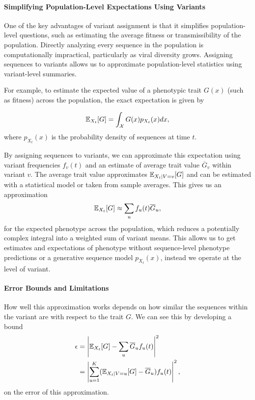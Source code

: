 \paragraph{Simplifying Population-Level Expectations Using Variants}

One of the key advantages of variant assignment is that it simplifies population-level questions, such as estimating the average fitness or transmissibility of the population. 
Directly analyzing every sequence in the population is computationally impractical, particularly as viral diversity grows. Assigning sequences to variants allows us to approximate population-level statistics using variant-level summaries.

For example, to estimate the expected value of a phenotypic trait $G(x)$ (such as fitness) across the population, the exact expectation is given by

\begin{equation}
  \mathbb{E}_{X_t}[G] = \int_{\mathcal{X}} G(x) p_{X_{t}}(x) dx,
\end{equation}
where $p_{X_t}(x)$ is the probability density of sequences at time $t$.

By assigning sequences to variants, we can approximate this expectation using variant frequencies $f_{v}(t)$ and an estimate of average trait value $\overline{G}_{v}$ within variant $v$.
The average trait value approximates $\mathbb{E}_{X_t \mid V=v}[G]$ and can be estimated with a statistical model or taken from sample averages.
This gives us an approximation
\begin{equation}
  \mathbb{E}_{X_t}[G] \approx \sum_{u} f_{u}(t) \overline{G}_u,
\end{equation}
for the expected phenotype across the population, which reduces a potentially complex integral into a weighted sum of variant means.
This allows us to get estimates and expectations of phenotype without sequence-level phenotype predictions or a generative sequence model $p_{X_t}(x)$, instead we operate at the level of variant.

\paragraph{Error Bounds and Limitations}

How well this approximation works depends on how similar the sequences within the variant are with respect to the trait $G$. 
We can see this by developing a bound 
\begin{align}
  \epsilon &= \left| \mathbb{E}_{X_t}[G]  - \sum_{u} \overline{G}_u f_{u}(t) \right|^2\\ 
           &= \left| \sum_{u=1}^{K} (\mathbb{E}_{X_{t} \mid V=u}[G] - \overline{G}_u) f_u(t) \right|^2,
\end{align}
on the error of this approximation.

